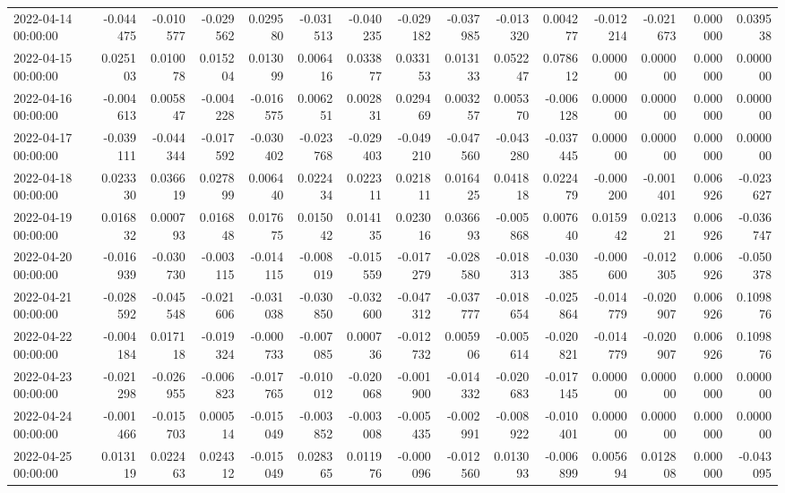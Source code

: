 \begin{tabular}{lrrrrrrrrrrrrrr}
2022-04-14 00:00:00 & -0.044475 & -0.010577 & -0.029562 & 0.029580 & -0.031513 & -0.040235 & -0.029182 & -0.037985 & -0.013320 & 0.004277 & -0.012214 & -0.021673 & 0.000000 & 0.039538 \\
2022-04-15 00:00:00 & 0.025103 & 0.010078 & 0.015204 & 0.013099 & 0.006416 & 0.033877 & 0.033153 & 0.013133 & 0.052247 & 0.078612 & 0.000000 & 0.000000 & 0.000000 & 0.000000 \\
2022-04-16 00:00:00 & -0.004613 & 0.005847 & -0.004228 & -0.016575 & 0.006251 & 0.002831 & 0.029469 & 0.003257 & 0.005370 & -0.006128 & 0.000000 & 0.000000 & 0.000000 & 0.000000 \\
2022-04-17 00:00:00 & -0.039111 & -0.044344 & -0.017592 & -0.030402 & -0.023768 & -0.029403 & -0.049210 & -0.047560 & -0.043280 & -0.037445 & 0.000000 & 0.000000 & 0.000000 & 0.000000 \\
2022-04-18 00:00:00 & 0.023330 & 0.036619 & 0.027899 & 0.006440 & 0.022434 & 0.022311 & 0.021811 & 0.016425 & 0.041818 & 0.022479 & -0.000200 & -0.001401 & 0.006926 & -0.023627 \\
2022-04-19 00:00:00 & 0.016832 & 0.000793 & 0.016848 & 0.017675 & 0.015042 & 0.014135 & 0.023016 & 0.036693 & -0.005868 & 0.007640 & 0.015942 & 0.021321 & 0.006926 & -0.036747 \\
2022-04-20 00:00:00 & -0.016939 & -0.030730 & -0.003115 & -0.014115 & -0.008019 & -0.015559 & -0.017279 & -0.028580 & -0.018313 & -0.030385 & -0.000600 & -0.012305 & 0.006926 & -0.050378 \\
2022-04-21 00:00:00 & -0.028592 & -0.045548 & -0.021606 & -0.031038 & -0.030850 & -0.032600 & -0.047312 & -0.037777 & -0.018654 & -0.025864 & -0.014779 & -0.020907 & 0.006926 & 0.109876 \\
2022-04-22 00:00:00 & -0.004184 & 0.017118 & -0.019324 & -0.000733 & -0.007085 & 0.000736 & -0.012732 & 0.005906 & -0.005614 & -0.020821 & -0.014779 & -0.020907 & 0.006926 & 0.109876 \\
2022-04-23 00:00:00 & -0.021298 & -0.026955 & -0.006823 & -0.017765 & -0.010012 & -0.020068 & -0.001900 & -0.014332 & -0.020683 & -0.017145 & 0.000000 & 0.000000 & 0.000000 & 0.000000 \\
2022-04-24 00:00:00 & -0.001466 & -0.015703 & 0.000514 & -0.015049 & -0.003852 & -0.003008 & -0.005435 & -0.002991 & -0.008922 & -0.010401 & 0.000000 & 0.000000 & 0.000000 & 0.000000 \\
2022-04-25 00:00:00 & 0.013119 & 0.022463 & 0.024312 & -0.015049 & 0.028365 & 0.011976 & -0.000096 & -0.012560 & 0.013093 & -0.006899 & 0.005694 & 0.012808 & 0.000000 & -0.043095 \\

\end{tabular}
